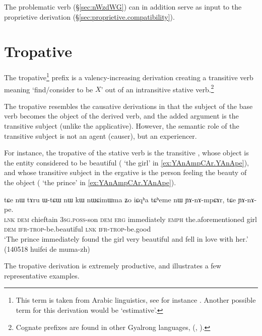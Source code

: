 The problematic verb    (§\ref{sec:nWzdWG}) can in addition serve as input to the proprietive derivation (§\ref{sec:proprietive.compatibility}).

\section{Tropative} \label{sec:tropative}
The tropative\footnote{This term is taken from Arabic linguistics, see for instance \citet{larcher96}. Another possible term for this derivation would be `estimative'. }  prefix is a valency-increasing derivation creating a transitive verb meaning `find/consider to be $X$' out of an intransitive stative verb.\footnote{Cognate prefixes are found in other Gyalrong languages, (\citealt[5--6]{jackson06paisheng}, \citealt{jacques13tropative}).} 
 
The tropative resembles the causative derivations in that the subject of the base verb becomes the object of the derived verb, and the added argument is the transitive subject (unlike the applicative). However, the semantic role of the transitive subject is not an agent (causer), but an experiencer.

For instance, the tropative of the stative verb  is the transitive , whose object is the entity considered to be beautiful ( `the girl' in \ref{ex:YAnAmpCAr.YAnApe}), and whose transitive subject in the ergative is the person feeling the beauty of the object ( `the prince' in \ref{ex:YAnAmpCAr.YAnApe}).


\begin{exe}
\ex \label{ex:YAnAmpCAr.YAnApe}
\gll tɕe nɯ tɤru ɯ-tɕɯ nɯ kɯ nɯɕimɯma ʑo iɕqʰa tɕʰeme nɯ ɲɤ-nɤ-mpɕɤr,
tɕe ɲɤ-nɤ-pe. \\
\textsc{lnk} \textsc{dem} chieftain \textsc{3sg}.\textsc{poss}-son \textsc{dem} \textsc{erg} immediately \textsc{emph} the.aforementioned girl \textsc{dem} \textsc{ifr}-\textsc{trop}-be.beautiful \textsc{lnk} \textsc{ifr}-\textsc{trop}-be.good \\
\glt `The prince immediately found the girl very beautiful and fell in love with her.' (140518 huifei de muma-zh)
\end{exe}

The tropative derivation is extremely productive, and  illustrates a few representative examples.

